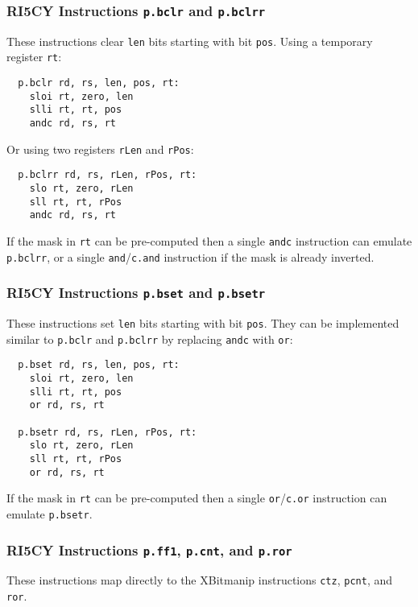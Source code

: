 \subsubsection{RI5CY Instructions {\tt p.bclr} and {\tt p.bclrr}}

These instructions clear {\tt len} bits starting with bit {\tt pos}. Using a
temporary register {\tt rt}:

\begin{verbatim}
  p.bclr rd, rs, len, pos, rt:
    sloi rt, zero, len
    slli rt, rt, pos
    andc rd, rs, rt
\end{verbatim}

Or using two registers {\tt rLen} and {\tt rPos}:

\begin{verbatim}
  p.bclrr rd, rs, rLen, rPos, rt:
    slo rt, zero, rLen
    sll rt, rt, rPos
    andc rd, rs, rt
\end{verbatim}

If the mask in {\tt rt} can be pre-computed then a single {\tt andc} instruction
can emulate {\tt p.bclrr}, or a single {\tt and}/{\tt c.and} instruction if the
mask is already inverted.

\subsubsection{RI5CY Instructions {\tt p.bset} and {\tt p.bsetr}}

These instructions set {\tt len} bits starting with bit {\tt pos}. They can be
implemented similar to {\tt p.bclr} and {\tt p.bclrr} by replacing {\tt andc}
with {\tt or}:

\begin{verbatim}
  p.bset rd, rs, len, pos, rt:
    sloi rt, zero, len
    slli rt, rt, pos
    or rd, rs, rt

  p.bsetr rd, rs, rLen, rPos, rt:
    slo rt, zero, rLen
    sll rt, rt, rPos
    or rd, rs, rt
\end{verbatim}

If the mask in {\tt rt} can be pre-computed then a single {\tt or}/{\tt c.or} instruction
can emulate {\tt p.bsetr}.

\subsubsection{RI5CY Instructions {\tt p.ff1}, {\tt p.cnt}, and {\tt p.ror}}

These instructions map directly to the XBitmanip instructions {\tt ctz}, {\tt pcnt}, and {\tt ror}.

